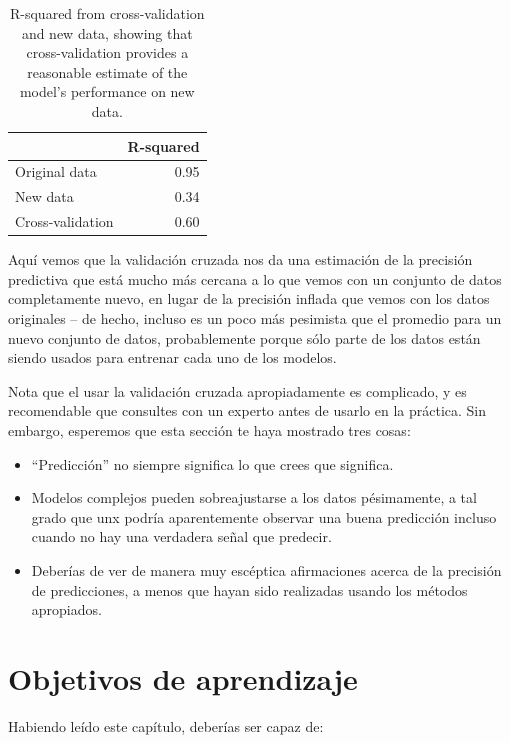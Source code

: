 \documentclass[
  12pt,
]{book}
\providecommand{\tightlist}{%
  \setlength{\itemsep}{0pt}\setlength{\parskip}{0pt}}
\begin{document}
\begin{table}

\caption{\label{tab:unnamed-chunk-90}R-squared from cross-validation and new data, showing that cross-validation provides a reasonable estimate of the model's performance on new data.}
\centering
\begin{tabular}[t]{l|r}
\hline
  & R-squared\\
\hline
Original data & 0.95\\
\hline
New data & 0.34\\
\hline
Cross-validation & 0.60\\
\hline
\end{tabular}
\end{table}

Aquí vemos que la validación cruzada nos da una estimación de la precisión predictiva que está mucho más cercana a lo que vemos con un conjunto de datos completamente nuevo, en lugar de la precisión inflada que vemos con los datos originales -- de hecho, incluso es un poco más pesimista que el promedio para un nuevo conjunto de datos, probablemente porque sólo parte de los datos están siendo usados para entrenar cada uno de los modelos.

Nota que el usar la validación cruzada apropiadamente es complicado, y es recomendable que consultes con un experto antes de usarlo en la práctica. Sin embargo, esperemos que esta sección te haya mostrado tres cosas:

\begin{itemize}
\tightlist
\item
  ``Predicción'' no siempre significa lo que crees que significa.
\item
  Modelos complejos pueden sobreajustarse a los datos pésimamente, a tal grado que unx podría aparentemente observar una buena predicción incluso cuando no hay una verdadera señal que predecir.
\item
  Deberías de ver de manera muy escéptica afirmaciones acerca de la precisión de predicciones, a menos que hayan sido realizadas usando los métodos apropiados.
\end{itemize}

\hypertarget{objetivos-de-aprendizaje-13}{%
\section{Objetivos de aprendizaje}\label{objetivos-de-aprendizaje-13}}

Habiendo leído este capítulo, deberías ser capaz de:
\end{document}
